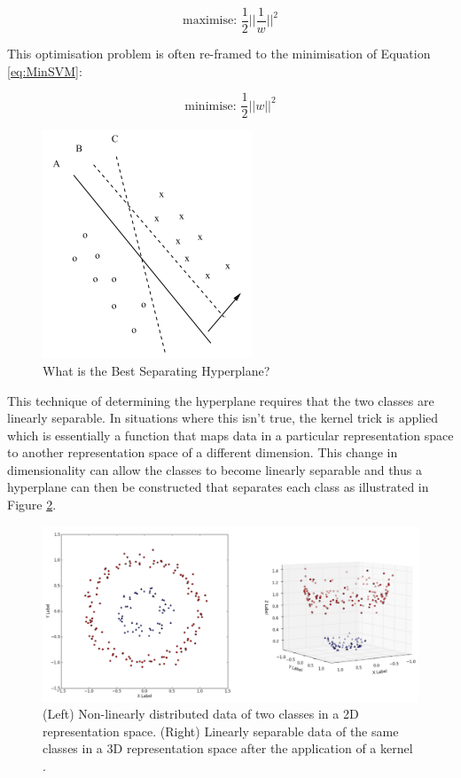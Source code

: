 \documentclass[a4paper,twoside,phd]{BYUPhys}
\begin{document}
\begin{equation}
\text{maximise: } \frac{1}{2}||\frac{1}{w}||^2
\label{eq:MaxSVM}
\end{equation}

This optimisation problem is often re-framed to the minimisation of Equation \ref{eq:MinSVM}:

\begin{equation}
\text{minimise: } \frac{1}{2}||w||^2
\label{eq:MinSVM}
\end{equation}


\begin{figure}[!h]
	\centering
	\includegraphics[totalheight=7cm]{images/svm-example.png}
	\caption{What is the Best Separating Hyperplane? \cite{Aggarwal2012}}
	\label{fig:SVMExample}
\end{figure}

This technique of determining the hyperplane requires that the two classes are linearly separable. In situations where this isn't true, the kernel trick \cite{aizerman67theoretical} is applied which is essentially a function that maps data in a particular representation space to another representation space of a different dimension. This change in dimensionality can allow the classes to become linearly separable and thus a hyperplane can then be constructed that separates each class as illustrated in Figure \ref{fig:KernelTrick}.

\begin{figure}[!htb]
	\centering
	\includegraphics[totalheight=7cm]{images/kernel-trick.png}
	\caption{(Left) Non-linearly distributed data of two classes in a 2D representation space. \newline
		(Right) Linearly separable data of the same classes in a 3D representation space after the application of a kernel \cite{UnderstandingKernel}.}
	\label{fig:KernelTrick}
\end{figure}
\end{document}
